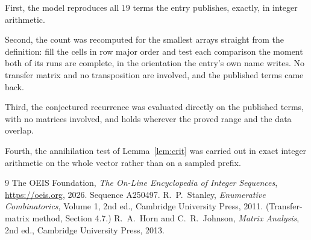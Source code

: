 \documentclass[11pt,a4paper]{article}
\theoremstyle{plain}
\theoremstyle{definition}
\begin{document}
First, the model reproduces all $19$ terms the entry publishes, exactly, in integer
arithmetic.

Second, the count was recomputed for the smallest arrays straight from the definition: fill the
cells in row major order and test each comparison the moment both of its runs are complete,
in the orientation the entry's own name writes. No transfer matrix and no transposition are
involved, and the published terms came back.

Third, the conjectured recurrence was evaluated directly on the published terms, with no
matrices involved, and holds wherever the proved range and the data overlap.

Fourth, the annihilation test of Lemma~\ref{lem:crit} was carried out in exact integer
arithmetic on the whole vector rather than on a sampled prefix.

\begin{thebibliography}{9}
 The OEIS Foundation, \emph{The On-Line Encyclopedia of Integer
Sequences}, \url{https://oeis.org}, 2026. Sequence A250497.
 R.~P.~Stanley, \emph{Enumerative Combinatorics}, Volume 1, 2nd ed.,
Cambridge University Press, 2011. (Transfer-matrix method, Section 4.7.)
 R.~A.~Horn and C.~R.~Johnson, \emph{Matrix Analysis}, 2nd ed., Cambridge
University Press, 2013.
\end{thebibliography}
\end{document}
